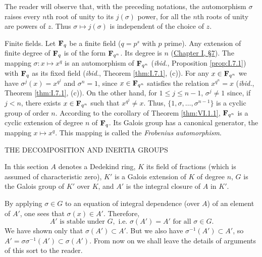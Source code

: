 The reader will observe that, with the preceding notations, the
automorphism $\sigma$ raises every $n$th root of unity to its $j(\sigma)$
power, for all the $n$th roots of unity are powers of $z$. Thus
$\sigma\mapsto j(\sigma)$ is independent of the choice of $z$.

\begin{example}\label{exa:VI.1.3}
Finite fields. Let $\mathbf{F}_{q}$ be a finite field ($q=p^{s}$ with $p$ prime). Any extension
of finite degree of $\mathbf{F}_{q}$ is of the form $\mathbf{F}_{q^{n}}$. Its degree is $n$
(\hyperref[sec:1.7]{Chapter I, §7}). The mapping $\sigma:x\mapsto x^{q}$ is an automorphism of
$\mathbf{F}_{q^{n}}$ (\emph{ibid.}, Proposition \ref{prop:I.7.1}) with $\mathbf{F}_{q}$ as
its fixed field (\emph{ibid.}, Theorem \ref{thm:I.7.1}, (c)). For any
$x\in\mathbf{F}_{q^{n}}$ we have $\sigma^{j}(x)=x^{q^{j}}$ and $\sigma^{n}=1$,
since $x\in\mathbf{F}_{q^{n}}$ satisfies the relation $x^{q^{n}}=x$ (\emph{ibid.},
Theorem \ref{thm:I.7.1}, (c)). On the other hand, for $1\leq j\leq n-1$,
$\sigma^{j}\neq1$ since, if $j<n$, there exists $x\in\mathbf{F}_{q^{n}}$ such that
$x^{q^{j}}\neq x$. Thus, $\{1,\sigma,\ldots,\sigma^{n-1}\}$ is a cyclic
group of order $n$. According to the corollary of Theorem
\ref{thm:VI.1.1}, $\mathbf{F}_{q^{n}}$ is a cyclic extension of degree $n$ of
$\mathbf{F}_{q}$. Its Galois group has a canonical generator, the mapping
$x\mapsto x^{q}$. This mapping is called the \emph{Frobenius
automorphism}.
\end{example}

%
        {THE DECOMPOSITION AND INERTIA GROUPS}

In this section $A$ denotes a Dedekind ring, $K$ its field of fractions
(which is assumed of characteristic zero), $K'$ is a Galois extension of
$K$ of degree $n$, $G$ is the Galois group of $K'$ over $K$, and $A'$ is
the integral closure of $A$ in $K'$.

By applying $\sigma\in G$ to an equation of integral dependence (over $A$)
of an element of $A'$, one sees that $\sigma(x)\in A'$. Therefore,
\begin{equation}
A'\text{ is stable under }G,\text{ i.e. }\sigma(A')=A'\text{ for all }
\sigma\in G.
\label{eq:VI.2.1}
\end{equation}
We have shown only that $\sigma(A')\subset A'$. But we also have
$\sigma^{-1}(A')\subset A'$, so $A'=\sigma\sigma^{-1}(A')\subset\sigma(A')$.
From now on we shall leave the details of arguments of this sort to the
reader.

